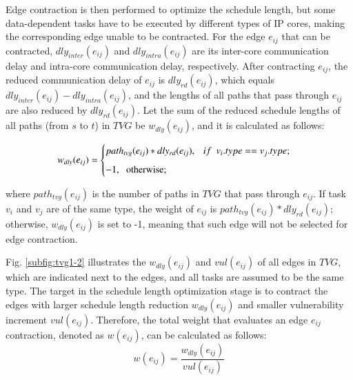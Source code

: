 \documentclass[10pt,journal, compsoc]{IEEEtran}
\begin{document}
Edge contraction is then performed to optimize the schedule length, but some data-dependent tasks have to be executed by different types of IP cores, making the corresponding edge unable to be contracted. For the edge $e_{ij}$ that can be contracted, $dly_{inter}(e_{ij})$ and $dly_{intra}(e_{ij})$ are its inter-core communication delay and intra-core communication delay, respectively. After contracting $e_{ij}$, the reduced communication delay of $e_{ij}$ is $dly_{rd}(e_{ij})$, which equals $dly_{inter}(e_{ij})-dly_{intra}(e_{ij})$, and the lengths of all paths that pass through $e_{ij}$ are also reduced by $dly_{rd}(e_{ij})$. Let the sum of the reduced schedule lengths of all paths (from $s$ to $t$) in $TVG$ be $w_{dly}(e_{ij})$, and it is calculated as follows:



\begin{eqnarray*}
	\begin{split}
		w_{dly}(e_{ij})=
		\begin{cases}
			path_{tvg}(e_{ij})*dly_{rd}(e_{ij}),  ~~~if~~v_i.type==v_j.type; \\[0.5em]
			 -1, ~~~$otherwise$; \\
		\end{cases}
	\end{split}
	\label{pro1}
\end{eqnarray*}

\noindent where $path_{tvg}(e_{ij})$ is the number of paths in $TVG$ that pass through $e_{ij}$. If task $v_i$ and $v_j$ are of the same type, the weight of $e_{ij}$ is $path_{tvg}(e_{ij})*dly_{rd}(e_{ij})$; otherwise, $w_{dly}(e_{ij})$ is set to -1, meaning that such edge will not be selected for edge contraction.




Fig. \ref{subfig:tvg1-2} illustrates the $w_{dly}(e_{ij})$ and $vul(e_{ij})$ of all edges in $TVG$, which are indicated next to the edges, and all tasks are assumed to be the same type. The target in the schedule length optimization stage is to contract the edges with larger schedule length reduction $w_{dly}(e_{ij})$ and smaller vulnerability increment $vul(e_{ij})$. Therefore, the total weight that evaluates an edge $e_{ij}$ contraction, denoted as $w(e_{ij})$, can be calculated as follows:
\begin{equation}
w(e_{ij}) = \frac{w_{dly}(e_{ij})}{vul(e_{ij})}
\label{equ:weight_e}
\end{equation}

\end{document}
